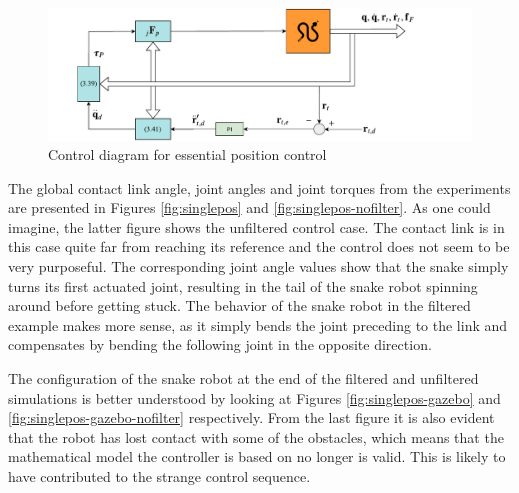 \begin{figure}[H]
    \centering
    \includegraphics[trim=1cm 0cm 3cm 0cm, clip=true, width=\textwidth]{figures/experiments/control-diagrams/p-control-diagram.pdf}
    \caption{Control diagram for essential position control}
    \label{fig:diag-p}
\end{figure}

The global contact link angle, joint angles and joint torques from the experiments are presented in Figures \ref{fig:singlepos} and \ref{fig:singlepos-nofilter}. As one could imagine, the latter figure shows the unfiltered control case. The contact link is in this case quite far from reaching its reference and the control does not seem to be very purposeful. The corresponding joint angle values show that the snake simply turns its first actuated joint, resulting in the tail of the snake robot spinning around before getting stuck. The behavior of the snake robot in the filtered example makes more sense, as it simply bends the joint preceding to the link and compensates by bending the following joint in the opposite direction.

The configuration of the snake robot at the end of the filtered and unfiltered simulations is better understood by looking at Figures \ref{fig:singlepos-gazebo} and \ref{fig:singlepos-gazebo-nofilter} respectively. From the last figure it is also evident that the robot has lost contact with some of the obstacles, which means that the mathematical model the controller is based on no longer is valid. This is likely to have contributed to the strange control sequence.

